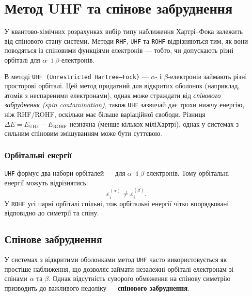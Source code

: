\section{Метод UHF та спінове забруднення}

У квантово-хімічних розрахунках вибір типу наближення Хартрі–Фока залежить від спінового стану системи.
Методи \texttt{RHF}, \texttt{UHF} та \texttt{ROHF} відрізняються тим, як вони поводяться із спіновими функціями електронів — тобто, чи допускають різні орбіталі для $\alpha$- і $\beta$-електронів.

В методі \texttt{UHF (Unrestricted Hartree–Fock)} --- $\alpha$- і $\beta$-електронів займають різні просторові орбіталі.
Цей метод придатний для відкритих оболонок (наприклад, атомів з неспареними електронами), однак може страждати від \emph{спінового забруднення (spin contamination)}, також \texttt{UHF} зазвичай дає трохи нижчу енергію, ніж RHF/ROHF, оскільки має більше варіаційної свободи.
Різниця $\Delta E = E_{\mathrm{UHF}} - E_{\mathrm{ROHF}}$ незначна (менше кількох міліХартрі), однак у системах з сильним спіновим змішуванням може бути суттєвою.

\subsubsection{Орбітальні енергії}

\texttt{UHF} формує два набори орбіталей --- для $\alpha$- і $\beta$-електронів.
Тому орбітальні енергії можуть відрізнятись:
\[
\varepsilon_i^{(\alpha)} \neq \varepsilon_i^{(\beta)}.
\]
У \texttt{ROHF} усі парні орбіталі спільні, тож орбітальні енергії чітко впорядковані відповідно до симетрії та спіну.

\subsection{Спінове забруднення}\label{sec:spin-contamination}

У системах з відкритими оболонками метод \texttt{UHF} часто використовується як простіше наближення, що дозволяє займати незалежні орбіталі електронам зі спінами $\alpha$ та $\beta$.
Однак відсутність суворого обмеження на спінову симетрію призводить до важливого недоліку --- \textbf{спінового забруднення}.


